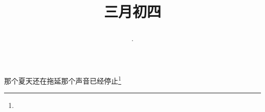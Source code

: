 \title{\date[d=12,m=4,y=2024][year:cn-y,年,month:cn,day:cn,日,·,weekday]·三月初四 }
那个夏天还在拖延那个声音已经停止\footnote{ }

